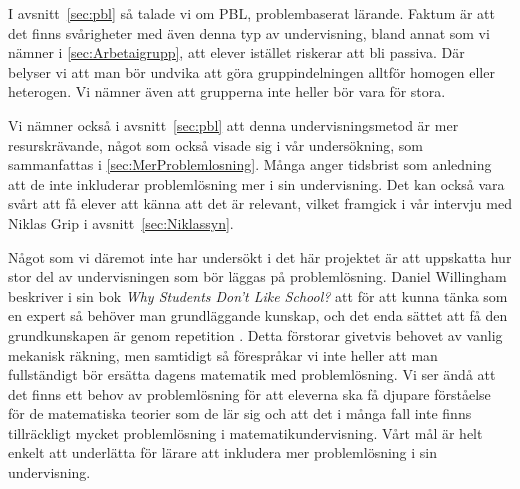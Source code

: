 \textcolor{Mahogany}{I avsnitt~\ref{sec:pbl} så talade vi om PBL, problembaserat lärande. Faktum är att det finns svårigheter med även denna typ av undervisning, bland annat som vi nämner i \ref{sec:Arbetaigrupp}, att elever istället riskerar att bli passiva. Där belyser vi att man bör undvika att göra gruppindelningen alltför homogen eller heterogen. Vi nämner även att grupperna inte heller bör vara för stora.}

\textcolor{Mahogany}{Vi nämner också i avsnitt~\ref{sec:pbl} att denna undervisningsmetod är mer resurskrävande, något som också visade sig i vår undersökning, som sammanfattas i \ref{sec:MerProblemlosning}. Många anger tidsbrist som anledning att de inte inkluderar problemlösning mer i sin undervisning. Det kan också vara svårt att få elever att känna att det är relevant, vilket framgick i vår intervju med Niklas Grip i avsnitt~\ref{sec:Niklassyn}.}

\textcolor{Mahogany}{Något som vi däremot inte har undersökt i det här projektet är att uppskatta hur stor del av undervisningen som bör läggas på problemlösning.} \textcolor{turkos}{Daniel Willingham beskriver i sin bok \textsl{Why Students Don't Like School?} att för att kunna tänka som en expert så behöver man grundläggande kunskap, och det enda sättet att få den grundkunskapen är genom repetition \cite{WhyDontStudents}. }\textcolor{Mahogany}{Detta förstorar givetvis behovet av vanlig mekanisk räkning, men samtidigt så förespråkar vi inte heller att man fullständigt bör ersätta dagens matematik med problemlösning. Vi ser ändå att det finns ett behov av problemlösning för att eleverna ska få djupare förståelse för de matematiska teorier som de lär sig och att det i många fall inte finns tillräckligt mycket problemlösning i matematikundervisning. Vårt mål är helt enkelt att underlätta för lärare att inkludera mer problemlösning i sin undervisning.}